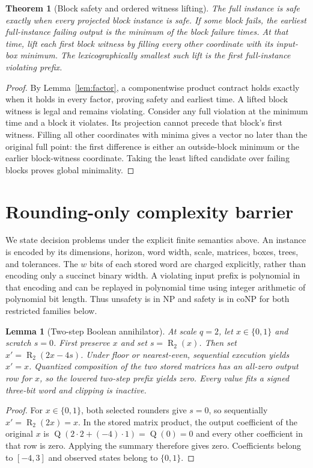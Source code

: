 \documentclass[11pt]{article}
\newtheorem{lemma}[definition]{Lemma}
\newtheorem{theorem}[definition]{Theorem}
\newcommand{\R}{\operatorname{R}}
\newcommand{\Q}{\operatorname{Q}}
\begin{document}
\begin{theorem}[Block safety and ordered witness lifting]\label{thm:block}
The full instance is safe exactly when every projected block instance is safe. If some block fails, the earliest full-instance failing output is the minimum of the block failure times. At that time, lift each first block witness by filling every other coordinate with its input-box minimum. The lexicographically smallest such lift is the first full-instance violating prefix.
\end{theorem}
\begin{proof}
By Lemma~\ref{lem:factor}, a componentwise product contract holds exactly when it holds in every factor, proving safety and earliest time. A lifted block witness is legal and remains violating. Consider any full violation at the minimum time and a block it violates. Its projection cannot precede that block's first witness. Filling all other coordinates with minima gives a vector no later than the original full point: the first difference is either an outside-block minimum or the earlier block-witness coordinate. Taking the least lifted candidate over failing blocks proves global minimality.
\end{proof}

\section{Rounding-only complexity barrier}
We state decision problems under the explicit finite semantics above. An instance is encoded by its dimensions, horizon, word width, scale, matrices, boxes, trees, and tolerances. The $w$ bits of each stored word are charged explicitly, rather than encoding only a succinct binary width. A violating input prefix is polynomial in that encoding and can be replayed in polynomial time using integer arithmetic of polynomial bit length. Thus unsafety is in NP and safety is in coNP for both restricted families below.

\begin{lemma}[Two-step Boolean annihilator]\label{lem:annihilator}
At scale $q=2$, let $x\in\{0,1\}$ and scratch $s=0$. First preserve $x$ and set $s=\R_2(x)$. Then set $x'=\R_2(2x-4s)$. Under floor or nearest-even, sequential execution yields $x'=x$. Quantized composition of the two stored matrices has an all-zero output row for $x$, so the lowered two-step prefix yields zero. Every value fits a signed three-bit word and clipping is inactive.
\end{lemma}
\begin{proof}
For $x\in\{0,1\}$, both selected rounders give $s=0$, so sequentially $x'=\R_2(2x)=x$. In the stored matrix product, the output coefficient of the original $x$ is $\Q(2\cdot2+(-4)\cdot1)=\Q(0)=0$ and every other coefficient in that row is zero. Applying the summary therefore gives zero. Coefficients belong to $[-4,3]$ and observed states belong to $\{0,1\}$.
\end{proof}
\end{document}
